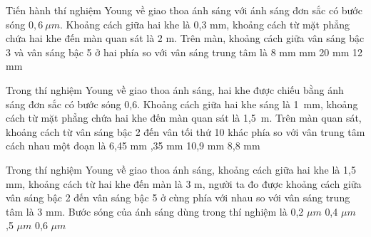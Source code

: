 \begin{vidu}%
 Tiến hành thí nghiệm Young về giao thoa ánh sáng với ánh sáng đơn sắc có bước sóng $0,6\ \mu m$. Khoảng cách giữa hai khe là 0,3 mm, khoảng cách từ mặt phẳng chứa hai khe đến màn quan sát là 2 m. Trên màn, khoảng cách giữa vân sáng bậc 3 và vân sáng bậc 5 ở hai phía so với vân sáng trung tâm là
\choice
{8 mm}
{ mm}
{20 mm}
{12 mm}
\end{vidu} 
\begin{vidu}%
Trong thí nghiệm Young về giao thoa ánh sáng, hai khe được chiếu bằng ánh sáng đơn sắc có bước sóng 0,6\microm. Khoảng cách giữa hai khe sáng là 1\ mm, khoảng cách từ mặt phẳng chứa hai khe đến màn quan sát là 1,5\ m. Trên màn quan sát, khoảng cách từ vân sáng bậc 2 đến vân tối thứ 10 khác phía so với vân trung tâm cách nhau một đoạn là
\choice
{6,45 mm}
{,35 mm}
{10,9 mm}
{8,8 mm}
\end{vidu} 
\begin{vidu}%
Trong thí nghiệm Young về giao thoa ánh sáng, khoảng cách giữa hai khe là 1,5 mm, khoảng cách từ hai khe đến màn là 3 m, người ta đo được khoảng cách giữa vân sáng bậc 2 đến vân sáng bậc 5 ở cùng phía với nhau so với vân sáng trung tâm là 3 mm. Bước sóng của ánh sáng dùng trong thí nghiệm là
\choice
{0,2 $\mu m $}
{0,4 $\mu m $}
{,5 $\mu m $}
{0,6 $\mu m $}
\end{vidu} 
